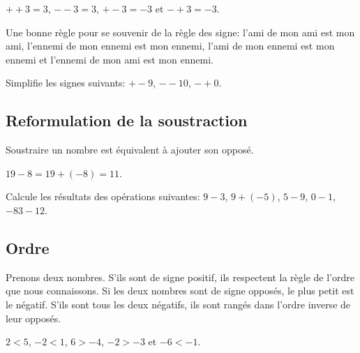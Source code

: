 \vspace{-13mm}

\begin{exemple}
	$+ +3 = 3$, $- - 3 = 3$, $+-3 = -3$ et $-+3 = -3$.
\end{exemple}

\begin{astuce}
	Une bonne règle pour se souvenir de la règle des signe: l'ami de mon ami est mon ami, l'ennemi de mon ennemi est mon ennemi, l'ami de mon ennemi est mon ennemi et l'ennemi de mon ami est mon ennemi.
\end{astuce}

\begin{exercice}
	Simplifie les signes suivants: $+- 9$, $-- 10$, $-+ 0$.
\end{exercice}


\subsection{Reformulation de la soustraction}

\begin{propriete}
	Soustraire un nombre est équivalent à ajouter son opposé.
\end{propriete}

\begin{exemple}
	$19 - 8 = 19 + (-8) = 11$.
\end{exemple}

\begin{exercice}
	Calcule les résultats des opérations suivantes: $9-3$, $9+(-5)$, $5-9$, $0-1$, $-83-12$.
\end{exercice}



\subsection{Ordre}

\begin{propriete}
	Prenons deux nombres. S'ils sont de signe positif, ils respectent la règle de l'ordre que nous connaissons. Si les deux nombres sont de signe opposés, le plus petit est le négatif. S'ils sont tous les deux négatifs, ils sont rangés dans l'ordre inverse de leur opposés.
\end{propriete}

\begin{exemple}
	$2<5$, $-2< 1$, $6> -4$, $-2> -3$ et $-6< -1$.
\end{exemple}

